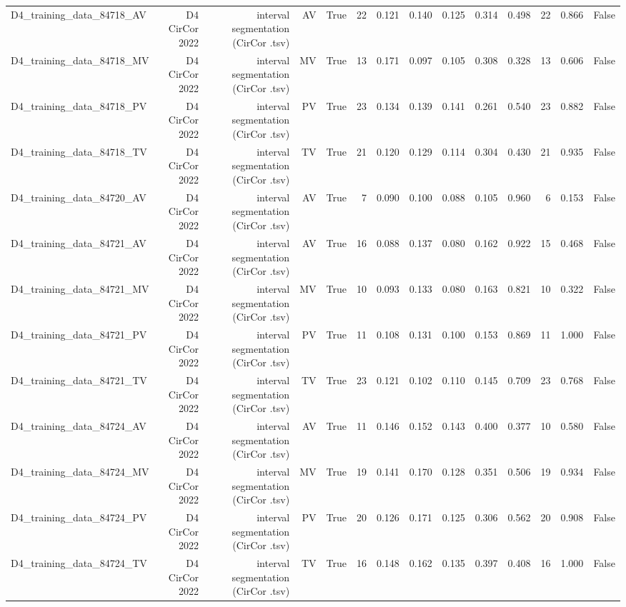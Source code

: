 \begin{table}[htbp]
\begin{tabular}{lrrrrrrrrrrrrr}
    D4\_training\_data\_84718\_AV & D4 CirCor 2022 & interval segmentation (CirCor .tsv) & AV & True & 22 & 0.121 & 0.140 & 0.125 & 0.314 & 0.498 & 22 & 0.866 & False \\
    D4\_training\_data\_84718\_MV & D4 CirCor 2022 & interval segmentation (CirCor .tsv) & MV & True & 13 & 0.171 & 0.097 & 0.105 & 0.308 & 0.328 & 13 & 0.606 & False \\
    D4\_training\_data\_84718\_PV & D4 CirCor 2022 & interval segmentation (CirCor .tsv) & PV & True & 23 & 0.134 & 0.139 & 0.141 & 0.261 & 0.540 & 23 & 0.882 & False \\
    D4\_training\_data\_84718\_TV & D4 CirCor 2022 & interval segmentation (CirCor .tsv) & TV & True & 21 & 0.120 & 0.129 & 0.114 & 0.304 & 0.430 & 21 & 0.935 & False \\
    D4\_training\_data\_84720\_AV & D4 CirCor 2022 & interval segmentation (CirCor .tsv) & AV & True & 7 & 0.090 & 0.100 & 0.088 & 0.105 & 0.960 & 6 & 0.153 & False \\
    D4\_training\_data\_84721\_AV & D4 CirCor 2022 & interval segmentation (CirCor .tsv) & AV & True & 16 & 0.088 & 0.137 & 0.080 & 0.162 & 0.922 & 15 & 0.468 & False \\
    D4\_training\_data\_84721\_MV & D4 CirCor 2022 & interval segmentation (CirCor .tsv) & MV & True & 10 & 0.093 & 0.133 & 0.080 & 0.163 & 0.821 & 10 & 0.322 & False \\
    D4\_training\_data\_84721\_PV & D4 CirCor 2022 & interval segmentation (CirCor .tsv) & PV & True & 11 & 0.108 & 0.131 & 0.100 & 0.153 & 0.869 & 11 & 1.000 & False \\
    D4\_training\_data\_84721\_TV & D4 CirCor 2022 & interval segmentation (CirCor .tsv) & TV & True & 23 & 0.121 & 0.102 & 0.110 & 0.145 & 0.709 & 23 & 0.768 & False \\
    D4\_training\_data\_84724\_AV & D4 CirCor 2022 & interval segmentation (CirCor .tsv) & AV & True & 11 & 0.146 & 0.152 & 0.143 & 0.400 & 0.377 & 10 & 0.580 & False \\
    D4\_training\_data\_84724\_MV & D4 CirCor 2022 & interval segmentation (CirCor .tsv) & MV & True & 19 & 0.141 & 0.170 & 0.128 & 0.351 & 0.506 & 19 & 0.934 & False \\
    D4\_training\_data\_84724\_PV & D4 CirCor 2022 & interval segmentation (CirCor .tsv) & PV & True & 20 & 0.126 & 0.171 & 0.125 & 0.306 & 0.562 & 20 & 0.908 & False \\
    D4\_training\_data\_84724\_TV & D4 CirCor 2022 & interval segmentation (CirCor .tsv) & TV & True & 16 & 0.148 & 0.162 & 0.135 & 0.397 & 0.408 & 16 & 1.000 & False \\

\end{tabular}
\end{table}

